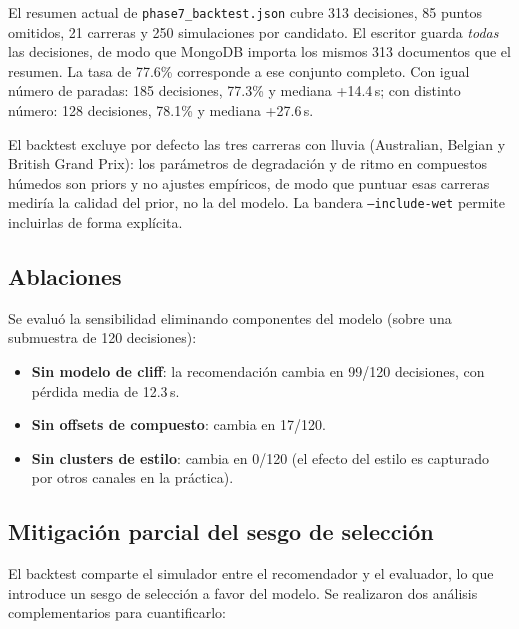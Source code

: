 \documentclass[conference]{IEEEtran}
\begin{document}
El resumen actual de \texttt{phase7\_backtest.json} cubre 313 decisiones,
85 puntos omitidos, 21 carreras y 250 simulaciones por candidato. El escritor
guarda \emph{todas} las decisiones, de modo que MongoDB importa los mismos 313
documentos que el resumen. La tasa de 77.6\% corresponde a ese conjunto
completo.
Con igual número de paradas: 185 decisiones, 77.3\% y mediana +14.4\,s;
con distinto número: 128 decisiones, 78.1\% y mediana +27.6\,s.

El backtest excluye por defecto las tres carreras con lluvia (Australian,
Belgian y British Grand Prix): los parámetros de degradación y de ritmo en
compuestos húmedos son priors y no ajustes empíricos, de modo que puntuar
esas carreras mediría la calidad del prior, no la del modelo. La bandera
\texttt{--include-wet} permite incluirlas de forma explícita.

\subsection{Ablaciones}

Se evaluó la sensibilidad eliminando componentes del modelo (sobre una
submuestra de 120 decisiones):
\begin{itemize}
  \item \textbf{Sin modelo de cliff}: la recomendación cambia en 99/120
        decisiones, con pérdida media de 12.3\,s.
  \item \textbf{Sin offsets de compuesto}: cambia en 17/120.
  \item \textbf{Sin clusters de estilo}: cambia en 0/120 (el efecto del
        estilo es capturado por otros canales en la práctica).
\end{itemize}

\subsection{Mitigación parcial del sesgo de selección}

El backtest comparte el simulador entre el recomendador y el evaluador, lo
que introduce un sesgo de selección a favor del modelo. Se realizaron dos
análisis complementarios para cuantificarlo:
\end{document}
